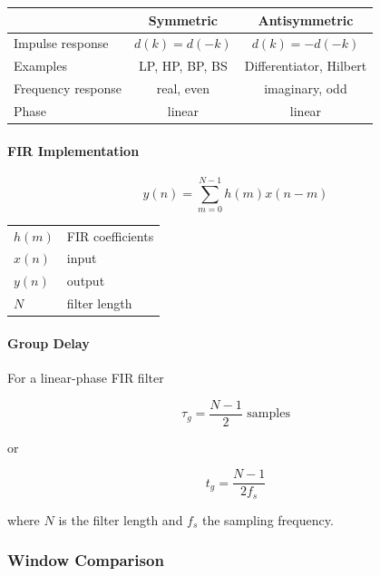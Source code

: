 \begin{center}
\renewcommand{\arraystretch}{1.2}
\begin{tabular}{l|c|c}
& Symmetric & Antisymmetric\\
\hline
Impulse response
&
$d(k)=d(-k)$
&
$d(k)=-d(-k)$
\\

Examples
&
LP, HP, BP, BS
&
Differentiator, Hilbert
\\

Frequency response
&
real, even
&
imaginary, odd
\\

Phase
&
linear
&
linear
\end{tabular}
\end{center}


\paragraph{FIR Implementation}

\[
\boxed{
y(n)=
\sum_{m=0}^{N-1}
h(m)x(n-m)
}
\]

\begin{center}
\begin{tabular}{ll}
$h(m)$ & FIR coefficients\\
$x(n)$ & input\\
$y(n)$ & output\\
$N$ & filter length
\end{tabular}
\end{center}


\paragraph{Group Delay}

For a linear-phase FIR filter

\[
\boxed{
\tau_g=\frac{N-1}{2}
\text{ samples}
}
\]

or

\[
\boxed{
t_g=\frac{N-1}{2f_s}
}
\]

where $N$ is the filter length and $f_s$ the sampling frequency.

\subsubsection{Window Comparison}

